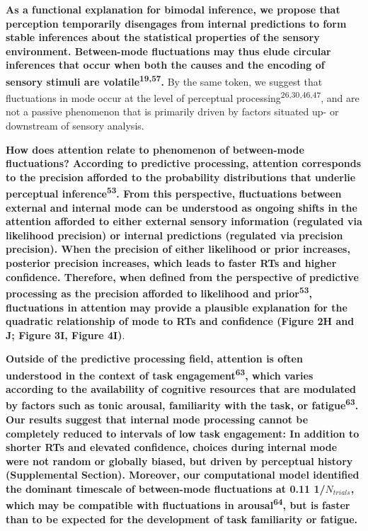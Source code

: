 \documentclass[
]{article}
\begin{document}
\textbf{As a functional explanation for bimodal inference, we propose
that perception temporarily disengages from internal predictions to form
stable inferences about the statistical properties of the sensory
environment. Between-mode fluctuations may thus elude circular
inferences that occur when both the causes and the encoding of sensory
stimuli are volatile\textsuperscript{19,57}.} By the same token, we
suggest that fluctuations in mode occur at the level of perceptual
processing\textsuperscript{26,30,46,47}, and are not a passive
phenomenon that is primarily driven by factors situated up- or
downstream of sensory analysis.

\textbf{How does attention relate to phenomenon of between-mode
fluctuations? According to predictive processing, attention corresponds
to the precision afforded to the probability distributions that underlie
perceptual inference\textsuperscript{53}. From this perspective,
fluctuations between external and internal mode can be understood as
ongoing shifts in the attention afforded to either external sensory
information (regulated via likelihood precision) or internal predictions
(regulated via precision precision). When the precision of either
likelihood or prior increases, posterior precision increases, which
leads to faster RTs and higher confidence. Therefore, when defined from
the perspective of predictive processing as the precision afforded to
likelihood and prior\textsuperscript{53}, fluctuations in attention may
provide a plausible explanation for the quadratic relationship of mode
to RTs and confidence (Figure 2H and J; Figure 3I, Figure 4I)}.

\textbf{Outside of the predictive processing field, attention is often
understood in the context of task engagement\textsuperscript{63}, which
varies according to the availability of cognitive resources that are
modulated by factors such as tonic arousal, familiarity with the task,
or fatigue\textsuperscript{63}. Our results suggest that internal mode
processing cannot be completely reduced to intervals of low task
engagement: In addition to shorter RTs and elevated confidence, choices
during internal mode were not random or globally biased, but driven by
perceptual history (Supplemental Section). Moreover, our computational
model identified the dominant timescale of between-mode fluctuations at
0.11 1/\(N_{trials}\), which may be compatible with fluctuations in
arousal\textsuperscript{64}, but is faster than to be expected for the
development of task familiarity or fatigue.}
\end{document}
